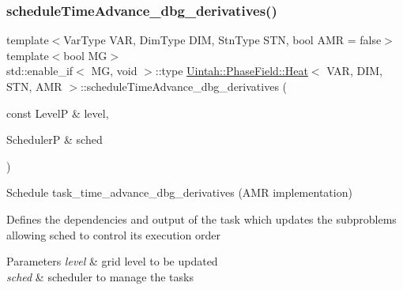 \subsubsection{\texorpdfstring{schedule\+Time\+Advance\+\_\+dbg\+\_\+derivatives()}{scheduleTimeAdvance\_dbg\_derivatives()}\hspace{0.1cm}{\footnotesize\ttfamily [2/2]}}
{\footnotesize\ttfamily template$<$Var\+Type V\+AR, Dim\+Type D\+IM, Stn\+Type S\+TN, bool A\+MR = false$>$ \\
template$<$bool MG$>$ \\
std\+::enable\+\_\+if$<$ MG, void $>$\+::type \hyperlink{classUintah_1_1PhaseField_1_1Heat}{Uintah\+::\+Phase\+Field\+::\+Heat}$<$ V\+AR, D\+IM, S\+TN, A\+MR $>$\+::schedule\+Time\+Advance\+\_\+dbg\+\_\+derivatives (\begin{DoxyParamCaption}\item[{const LevelP \&}]{level,  }\item[{SchedulerP \&}]{sched }\end{DoxyParamCaption})\hspace{0.3cm}{\ttfamily [protected]}}



Schedule task\+\_\+time\+\_\+advance\+\_\+dbg\+\_\+derivatives (A\+MR implementation) 

Defines the dependencies and output of the task which updates the subproblems allowing sched to control its execution order


\begin{DoxyParams}{Parameters}
{\em level} & grid level to be updated \\
\hline
{\em sched} & scheduler to manage the tasks \\
\hline
\end{DoxyParams}
\mbox{\label{classUintah_1_1PhaseField_1_1Heat_acc85b548081a60269deee446d0fb0f4b}} 
